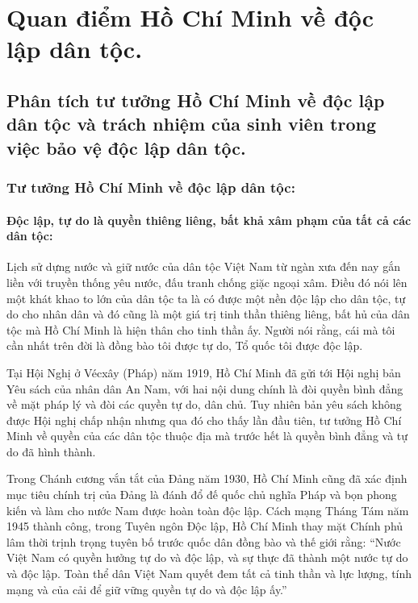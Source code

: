 \section{Quan điểm Hồ Chí Minh về độc lập dân tộc.}

\subsection{Phân tích tư tưởng Hồ Chí Minh về độc lập dân tộc và trách nhiệm của sinh viên trong việc bảo vệ độc lập dân tộc.}

\subsubsection{Tư tưởng Hồ Chí Minh về độc lập dân tộc:}

\paragraph{Độc lập, tự do là quyền thiêng liêng, bất khả xâm phạm của tất cả các dân tộc:}
Lịch sử dựng nước và giữ nước của dân tộc Việt Nam từ ngàn xưa đến nay gắn liền với truyền thống yêu nước, đấu tranh chống giặc ngoại xâm. Điều đó nói lên một khát khao to lớn của dân tộc ta là có được một nền độc lập cho dân tộc, tự do cho nhân dân và đó cũng là một giá trị tinh thần thiêng liêng, bất hủ của dân tộc mà Hồ Chí Minh là hiện thân cho tinh thần ấy. Người nói rằng, cái mà tôi cần nhất trên đời là đồng bào tôi được tự do, Tổ quốc tôi được độc lập.

Tại Hội Nghị ở Vécxây (Pháp) năm 1919, Hồ Chí Minh đã gửi tới Hội nghị bản Yêu sách của nhân dân An Nam, với hai nội dung chính là đòi quyền bình đẳng về mặt pháp lý và đòi các quyền tự do, dân chủ. Tuy nhiên bản yêu sách không được Hội nghị chấp nhận nhưng qua đó cho thấy lần đầu tiên, tư tưởng Hồ Chí Minh về quyền của các dân tộc thuộc địa mà trước hết là quyền bình đẳng và tự do đã hình thành.

Trong Chánh cương vắn tắt của Đảng năm 1930, Hồ Chí Minh cũng đã xác định mục tiêu chính trị của Đảng là đánh đổ đế quốc chủ nghĩa Pháp và bọn phong kiến và làm cho nước Nam được hoàn toàn độc lập. Cách mạng Tháng Tám năm 1945 thành công, trong Tuyên ngôn Độc lập, Hồ Chí Minh thay mặt Chính phủ lâm thời trịnh trọng tuyên bố trước quốc dân đồng bào và thế giới rằng: ``Nước Việt Nam có quyền hưởng tự do và độc lập, và sự thực đã thành một nước tự do và độc lập. Toàn thể dân Việt Nam quyết đem tất cả tinh thần và lực lượng, tính mạng và của cải để giữ vững quyền tự do và độc lập ấy.''

